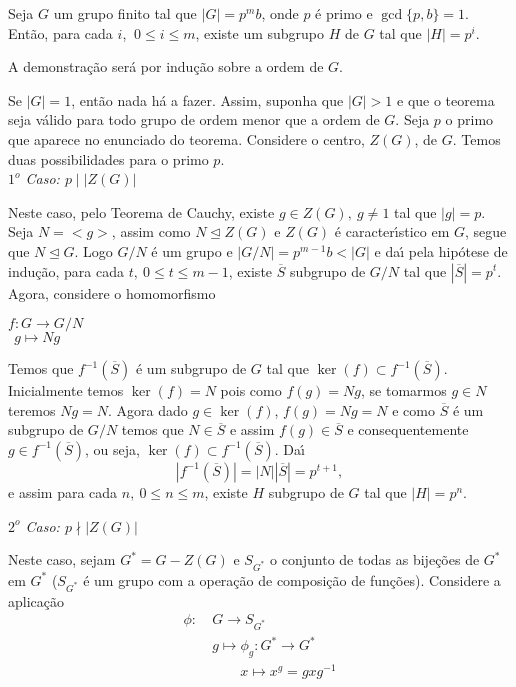 \begin{teorema}\label{primeiro_teorema_de_sylow}
Seja $G$ um grupo finito tal que \linebreak $|G| = p^m b$, onde $p$ {\'e} primo e $\gcd\{p, b\} = 1$. Ent{\~a}o, para cada $i$, $\ 0 \le i \le m$, existe um subgrupo $H$ de $G$ tal que $|H| = p^i$.
\end{teorema}
\begin{prova}
A demonstra{\c c}{\~a}o ser{\'a} por indu{\c c}{\~a}o sobre a ordem de $G$.

Se $|G| = 1$, ent{\~a}o nada h{\'a} a fazer. Assim, suponha que $|G| > 1$ e que o teorema seja v{\'a}lido para todo grupo de ordem menor que a ordem de
$G$. Seja $p$ o primo que aparece no enunciado do teorema. Considere o centro, $Z(G)$, de $G$. Temos duas possibilidades para o primo $p$.\\
\textit{$1^o$ Caso: $p \mid |Z(G)|$}

Neste caso, pelo Teorema de Cauchy, existe $g \in Z(G),\ g \neq 1$ tal que $|g| = p$. Seja $N = <g>$, assim como $N \trianglelefteq Z(G)$ e $Z(G)$ {\'e} caracter{\'\i}stico em $G$, segue que $N \trianglelefteq G$. Logo $G/N$ {\'e} um grupo e $|G/N| = p^{m-1}b < |G|$ e da{\'\i} pela hip{\'o}tese
de indu{\c c}{\~a}o, para cada $t,\ 0 \le t \le m-1$, existe $\overline{S}$ subgrupo de $G/N$ tal que $|\overline{S}| = p^t$. Agora, considere o homomorfismo
\begin{center}
$ f: G \to G/N$\\
$\ \ g \mapsto Ng$
\end{center}

Temos que $f^{-1}(\overline{S})$ {\'e} um subgrupo de $G$ tal que $\ker(f) \subset f^{-1}(\overline{S})$. Inicialmente temos $\ker (f) = N$ pois como
$f(g) = Ng$, se tomarmos $g \in N$  teremos $Ng = N$. Agora dado $g \in \ker (f)$, $f(g) = Ng = N$ e como $\overline{S}$ {\'e} um subgrupo de $G/N$ temos
que $N \in \overline{S}$ e assim $f(g) \in \overline{S}$ e consequentemente $g \in f^{-1} (\overline{S})$, ou seja, $\ker (f) \subset
f^{-1}(\overline{S})$. Da{\'\i} $$|f^{-1}(\overline{S})| = |N||\overline{S}| = p^{t+1},$$ e assim para cada $n,\ 0 \le n \le m$, existe $H$ subgrupo de $G$
tal que $|H| = p^n$.

\textit{$2^o$ Caso: $p \nmid |Z(G)|$}

Neste caso, sejam $G^* = G - Z(G)$ e $S_{G^*}$ o conjunto de todas as bije{\c c}{\~o}es de $G^*$ em $G^*$ ($S_{G^*}$ {\'e} um grupo com a opera{\c
c}{\~a}o de composi{\c c}{\~a}o de fun{\c c}{\~o}es). Considere a aplica{\c c}{\~a}o
\begin{align*}
\phi :\ &G \to S_{G^*}\\
&g \mapsto \phi_g : G^* \to G^*\\
&\qquad x \mapsto x^g = gxg^{-1}
\end{align*}


\end{prova}
